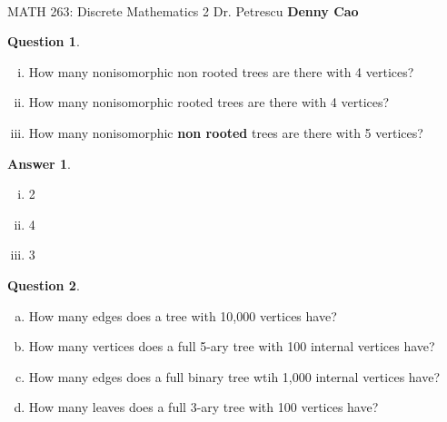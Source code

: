 \documentclass[article, 12pt]{article}
\title{\Huge\bf{\psetName}}
\author{\name}
\date{\dueDate}
\author{\name}
\date{\dueDate}
\makeatletter
\theoremstyle{definition}
\newcommand{\courseNumber}{MATH 263}
\newcommand{\courseName}{Discrete Mathematics 2}
\newcommand{\professor}{Dr. Petrescu}
\newcommand{\name}{Denny Cao}
\newtheorem{question}{Question}
\newtheorem{answer}{Answer}
\renewcommand{\maketitle}{\bgroup\setlength{\parindent}{0pt}
    \begin{flushleft}
        \textbf{\@title} \\ \vskip0.2cm
        \begingroup
            \fontsize{14pt}{12pt}\selectfont
            \courseNumber: \courseName 
            \vskip0.3cm 
            \professor
        \endgroup \vskip0.3cm
        \@date \hfill\rlap{}\bf{\name} \\ \vskip0.1cm
        \hrulefill
    \end{flushleft}\egroup 
}
\makeatother
\begin{document}
    \maketitle
    \thispagestyle{plain}

    \begin{question} \
        \label{q1}
        \begin{enumerate}[(i)]
            \item How many nonisomorphic non rooted trees are there with 4 vertices?
            \item How many nonisomorphic rooted trees are there with 4 vertices?
            \item How many nonisomorphic \textbf{non rooted} trees are there with 5 vertices?
        \end{enumerate}
    \end{question}

    \begin{answer} \
        \label{a1}
        \begin{enumerate}[(i)]
            \item 2
            \item 4
            \item 3
        \end{enumerate}
    \end{answer}

    \begin{question} \
        \label{q2}
        \begin{enumerate}[a)]
            \item How many edges does a tree with 10,000 vertices have?
            \item How many vertices does a full 5-ary tree with 100 internal vertices have?
            \item How many edges does a full binary tree wtih 1,000 internal vertices have?
            \item How many leaves does a full 3-ary tree with 100 vertices have?
        \end{enumerate}
    \end{question}
\end{document}
